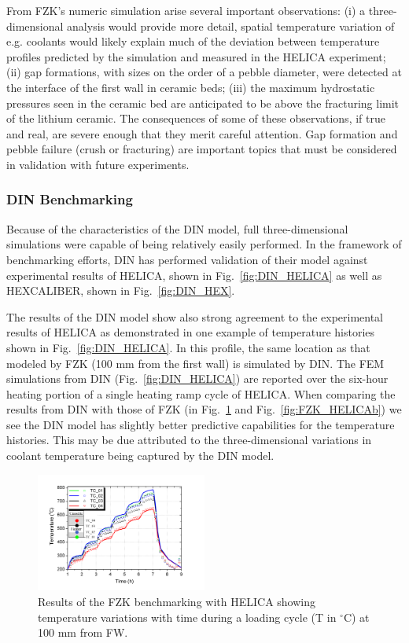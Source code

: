 From FZK's numeric simulation arise several important observations: (i) a three-dimensional analysis would provide more detail, spatial temperature variation of e.g. coolants would likely explain much of the deviation between temperature profiles predicted by the simulation and measured in the HELICA experiment; (ii) gap formations, with sizes on the order of a pebble diameter, were detected at the interface of the first wall in ceramic beds; (iii) the maximum hydrostatic pressures seen in the ceramic bed are anticipated to be above the fracturing limit of the lithium ceramic. The consequences of some of these observations, if true and real, are severe enough that they merit careful attention. Gap formation and pebble failure (crush or fracturing) are important topics that must be considered in validation with future experiments.

\subsubsection{DIN Benchmarking}
Because of the characteristics of the DIN model, full three-dimensional simulations were capable of being relatively easily performed. In the framework of benchmarking efforts, DIN has performed validation of their model against experimental results of HELICA, shown in Fig.~\ref{fig:DIN_HELICA} as well as HEXCALIBER, shown in Fig.~\ref{fig:DIN_HEX}.

The results of the DIN model show also strong agreement to the experimental results of HELICA as demonstrated in one example of temperature histories shown in Fig.~\ref{fig:DIN_HELICA}. In this profile, the same location as that modeled by FZK (100 mm from the first wall) is simulated by DIN. The FEM simulations from DIN (Fig.~\ref{fig:DIN_HELICA}) are reported over the six-hour heating portion of a single heating ramp cycle of HELICA. When comparing the results from DIN with those of FZK (in Fig.~\ref{fig:FZK_HELICAa} and Fig.~\ref{fig:FZK_HELICAb}) we see the DIN model has slightly better predictive capabilities for the temperature histories. This may be due attributed to the three-dimensional variations in coolant temperature being captured by the DIN model. 


\begin{figure}[t!]
\centering
\includegraphics[width=0.5\textwidth]{chapters/figures/Fig-6}
\caption{Results of the FZK benchmarking with HELICA\cite{Gan:2009vn} showing temperature variations with time during a loading cycle (T in $^\circ$C) at 100 mm from FW.}\label{fig:FZK_HELICAa}
\end{figure}

